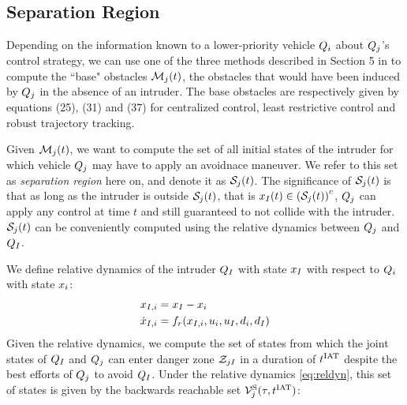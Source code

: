 \subsection{Separation Region} \label{sec:sepRegion}
Depending on the information known to a lower-priority vehicle $Q_i$ about $Q_j$'s control strategy, we can use one of the three methods described in Section 5 in \cite{chen2016robust} to compute the ``base" obstacles $\mathcal{M}_j(t)$, the obstacles that would have been induced by $Q_j$ in the absence of an intruder. The base obstacles are respectively given by equations (25), (31) and (37) for centralized control, least restrictive control and robust trajectory tracking.

Given $\mathcal{M}_j(t)$, we want to compute the set of all initial states of the intruder for which vehicle $Q_j$ may have to apply an avoidnace maneuver. We refer to this set as \textit{separation region} here on, and denote it as $\mathcal{S}_j(t)$. The significance of $\mathcal{S}_j(t)$ is that as long as the intruder is outside $\mathcal{S}_j(t)$, that is $x_{I}(t) \in \left(\mathcal{S}_j(t)\right)^c$, $Q_j$ can apply any control at time $t$ and still guaranteed to not collide with the intruder. $\mathcal{S}_j(t)$ can be conveniently computed using the relative dynamics between $Q_j$ and $Q_{I}$. 

We define relative dynamics of the intruder $Q_{I}$ with state $x_I$ with respect to $Q_i$ with state $x_i$:
\begin{equation}
\label{eq:reldyn}
\begin{aligned}
\state_{\intr, i} &= \state_\intr - \state_i \\
\dot \state_{\intr, i} &= f_r(\state_{\intr, i}, \ctrl_i, \ctrl_\intr, \dstb_i, \dstb_\intr)
\end{aligned}
\end{equation}
Given the relative dynamics, we compute the set of states from which the joint states of $Q_{I}$ and $Q_{j}$ can enter danger zone $\mathcal{Z}_{jI}$ in a duration of $t^\text{IAT}$ despite the best efforts of $Q_j$ to avoid $Q_{I}$. Under the relative dynamics \eqref{eq:reldyn}, this set of states is given by the backwards reachable set $\mathcal{V}^{\text{S}}_j(\tau, t^\text{IAT})$:

